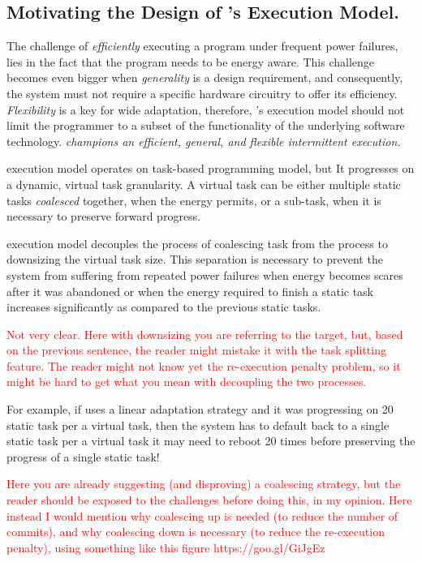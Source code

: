 \subsection {Motivating the Design of \sys's Execution Model.} The challenge of \emph{efficiently} executing a program under frequent power failures, lies in the fact that the program needs to be energy aware. This challenge becomes even bigger when \emph{generality} is a design requirement, and consequently, the system must not require a specific hardware circuitry to offer its efficiency. \emph{Flexibility} is a key for wide adaptation, therefore, \sys's execution model should not limit the programmer to a subset of the functionality of the underlying software technology. \emph{\sys champions an efficient, general, and flexible intermittent execution.}

\sys execution model operates on task-based programming model, but It progresses on a dynamic, virtual task granularity. A virtual task can be either multiple static tasks \emph{coalesced} together, when the energy permits, or a sub-task, when it is necessary to preserve forward progress.

\sys execution model decouples the process of coalescing task from the process to downsizing the virtual task size. This separation is necessary to prevent the system from suffering from repeated power failures when energy becomes scares after it was abandoned or when the energy required to finish a static task increases significantly as compared to the previous static tasks.
 
\textcolor{red}{Not very clear. Here with downsizing you are referring to the target, but, based on the previous sentence, the reader might mistake it with the task splitting feature. The reader might not know yet the re-execution penalty problem, so it might be hard to get what you mean with decoupling the two processes.}

For example, if \sys uses a linear adaptation strategy and it was progressing on 20 static task per a virtual task, then the system has to default back to a single static task per a virtual task it may need to reboot 20 times before preserving the progress of a single static task!

\textcolor{red}{
Here you are already suggesting (and disproving) a coalescing strategy, but the reader should be exposed to the challenges before doing this, in my opinion. Here instead I would mention why coalescing up is needed (to reduce the number of commits), and why coalescing down is necessary (to reduce the re-execution penalty), using something like this figure https://goo.gl/GiJgEz}


